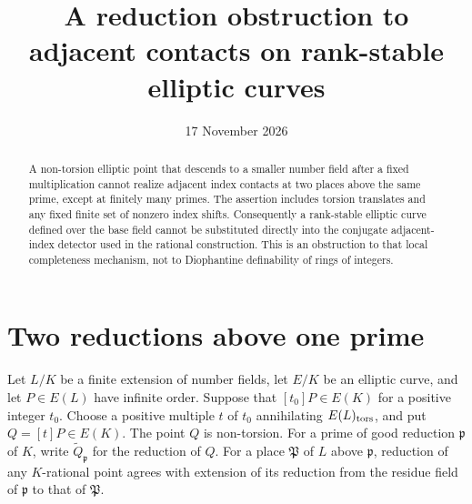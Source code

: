 \documentclass[11pt,a4paper]{article}
\title{A reduction obstruction to adjacent contacts on rank-stable elliptic curves}
\author{}\date{17 November 2026}
\begin{document}
\maketitle
\begin{abstract}
A non-torsion elliptic point that descends to a smaller number field
after a fixed multiplication cannot realize adjacent index contacts
at two places above the same prime, except at finitely many primes.
The assertion includes torsion translates and any fixed finite set
of nonzero index shifts. Consequently a rank-stable elliptic curve
defined over the base field cannot be substituted directly into the
conjugate adjacent-index detector used in the rational construction.
This is an obstruction to that local completeness mechanism, not to
Diophantine definability of rings of integers.
\end{abstract}

\section{Two reductions above one prime}
Let $L/K$ be a finite extension of number fields, let $E/K$ be an
elliptic curve, and let $P\in E(L)$ have infinite order. Suppose
that $[t_0]P\in E(K)$ for a positive integer $t_0$.
Choose a positive multiple $t$ of $t_0$ annihilating
$E(L)_{\rm tors}$, and put $Q=[t]P\in E(K)$. The point $Q$ is
non-torsion. For a prime of good reduction $\mathfrak p$ of $K$,
write $\widetilde Q_{\mathfrak p}$ for the reduction of $Q$.
For a place $\mathfrak P$ of $L$ above $\mathfrak p$, reduction
of any $K$-rational point agrees with extension of its reduction
from the residue field of $\mathfrak p$ to that of $\mathfrak P$.
\end{document}
